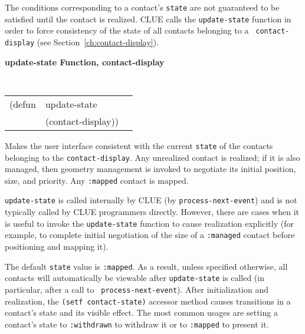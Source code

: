 The conditions corresponding to a contact's {\tt state} are not guaranteed to be
satisfied until the contact is realized.
CLUE calls the {\tt update-state} function 
 in
order to force consistency of the state of all contacts belonging to a {\tt
contact-display} (see Section~\ref{ch:contact-display}).

{\samepage
{\large {\bf update-state \hfill Function, contact-display}} 
\begin{flushright} \parbox[t]{6.125in}{
\tt
\begin{tabular}{lll}
\raggedright
(defun & update-state & \\ 
& (contact-display))
\end{tabular}
\rm

}\end{flushright}}

\begin{flushright} \parbox[t]{6.125in}{
Makes the user interface consistent with the current {\tt state} of the contacts
belonging to the {\tt contact-display}. Any unrealized contact is realized; if
it is also managed, then geometry management is invoked to negotiate its initial
position, size, and priority. Any {\tt :mapped} contact is mapped.

{\tt update-state} is called internally by CLUE (by  {\tt process-next-event})
 and is not typically called by CLUE
programmers directly. However,
there are cases when it is useful to invoke the {\tt update-state} function to
cause
realization explicitly (for example, to complete initial negotiation of the size
of a {\tt :managed} contact before positioning and mapping it). 

}\end{flushright}

The default {\tt state} value is {\tt :mapped}. As a result, unless
specified otherwise, all contacts will automatically be viewable after 
{\tt update-state} is called (in particular, after a call to {\tt
process-next-event}).  After initialization and realization, 
the {\tt (setf contact-state)} accessor method causes transitions in a contact's
state and its visible effect. The most common usages are setting a contact's
state to {\tt :withdrawn} to withdraw it or to {\tt :mapped} to present it.

